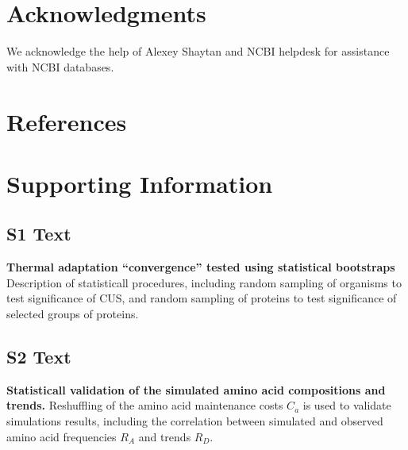 \documentclass[10pt,letterpaper]{article}
\begin{document}
\section*{Acknowledgments}
We acknowledge the help of Alexey Shaytan and NCBI helpdesk for assistance with NCBI databases.


\section*{References}
%
%
% 




\section*{Supporting Information}

\subsection*{S1 Text}
\label{text:s1}
{\bf Thermal adaptation ``convergence'' tested using statistical bootstraps}
Description of statisticall procedures, including random sampling of organisms to test significance of CUS, and random sampling of proteins to test significance of selected groups of proteins.


\subsection*{S2 Text}
\label{text:s2}
{\bf Statisticall validation of the simulated amino acid compositions and trends.}
Reshuffling of the amino acid maintenance costs $C_{a}$ is used to validate simulations results, including the correlation between simulated and observed amino acid frequencies $R_A$ and trends $R_D$.
\end{document}

